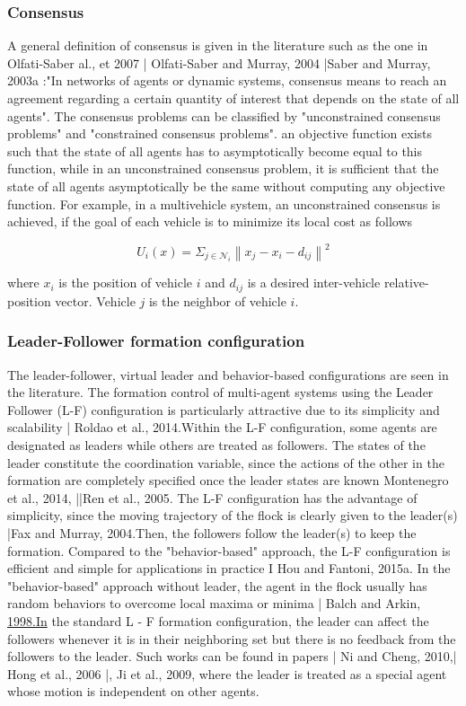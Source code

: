 \documentclass[10pt]{article}
\begin{document}
\subsubsection{Consensus}
A general definition of consensus is given in the literature such as the one in Olfati-Saber al., et 2007 | Olfati-Saber and Murray, 2004 |Saber and Murray, 2003a :"In networks of agents or dynamic systems, consensus means to reach an agreement regarding a certain quantity of interest that depends on the state of all agents". The consensus problems can be classified by "unconstrained consensus problems" and "constrained consensus problems". an objective function exists such that the state of all agents has to asymptotically become equal to this function, while in an unconstrained consensus problem, it is sufficient that the state of all agents asymptotically be the same without computing any objective function. For example, in a multivehicle system, an unconstrained consensus is achieved, if the goal of each vehicle is to minimize its local cost as follows

$$
U_{i}(x)=\Sigma_{j \in \mathcal{N}_{i}}\left\|x_{j}-x_{i}-d_{i j}\right\|^{2}
$$

where $x_{i}$ is the position of vehicle $i$ and $d_{i j}$ is a desired inter-vehicle relative-position vector. Vehicle $j$ is the neighbor of vehicle $i$.

\subsubsection{Leader-Follower formation configuration}
The leader-follower, virtual leader and behavior-based configurations are seen in the literature. The formation control of multi-agent systems using the Leader Follower (L-F) configuration is particularly attractive due to its simplicity and scalability | Roldao et al., 2014.Within the L-F configuration, some agents are designated as leaders while others are treated as followers. The states of the leader constitute the coordination variable, since the actions of the other in the formation are completely specified once the leader states are known Montenegro et al., 2014, ||Ren et al., 2005. The L-F configuration has the advantage of simplicity, since the moving trajectory of the flock is clearly given to the leader(s) |Fax and Murray, 2004.Then, the followers follow the leader(s) to keep the formation. Compared to the "behavior-based" approach, the L-F configuration is efficient and simple for applications in practice I Hou and Fantoni, 2015a. In the "behavior-based" approach without leader, the agent in the flock usually has random behaviors to overcome local maxima or minima | Balch and Arkin, \href{http://1998.In}{1998.In} the standard L - F formation configuration, the leader can affect the followers whenever it is in their neighboring set but there is no feedback from the followers to the leader. Such works can be found in papers | Ni and Cheng, 2010,| Hong et al., 2006 |, Ji et al., 2009, where the leader is treated as a special agent whose motion is independent on other agents.
\end{document}
